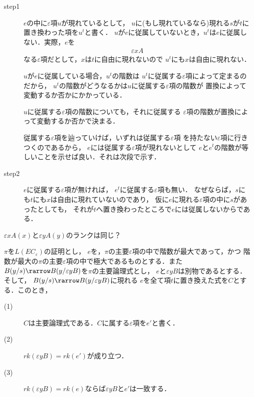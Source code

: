 	\begin{metaprf}\mbox{}
		\begin{description}
			\item[step1]
				$e$の中に$\varepsilon$項$u$が現れているとして，
				$u$に(もし現れているなら)現れる$s$が$t$に置き換わった項を$u^{t}$と書く．
				$u$が$e$に従属していないとき，$u^{t}$は$e$に従属しない．実際，$e$を
				\begin{align}
					\varepsilon x A
				\end{align}
				なる$\varepsilon$項だとして，$x$は$t$に自由に現れないので
				$u^{t}$にも$x$は自由に現れない．
				
				$u$が$e$に従属している場合，$u^{t}$の階数は
				$u^{t}$に従属する$\varepsilon$項によって定まるのだから，
				$u^{t}$の階数がどうなるかは$u$に従属する$\varepsilon$項の階数が
				置換によって変動するか否かにかかっている．
				
				$u$に従属する$\varepsilon$項の階数についても，それに従属する
				$\varepsilon$項の階数が置換によって変動するか否かで決まる．
				
				従属する$\varepsilon$項を辿っていけば，いずれは従属する$\varepsilon$項
				を持たない$\varepsilon$項に行きつくのであるから，
				$e$には従属する$\varepsilon$項が現れないとして
				$e$と$e^{t}$の階数が等しいことを示せば良い．それは次段で示す．
				
			\item[step2]
				$e$に従属する$\varepsilon$項が無ければ，
				$e^{t}$に従属する$\varepsilon$項も無い．
				なぜならば，$s$にも$t$にも$x$は自由に現れていないのであり，
				仮に$e$に現れる$\varepsilon$項の中に$s$があったとしても，
				それが$t$へ置き換わったところで$e$には従属しないからである．
				\QED
		\end{description}
	\end{metaprf}
	
	$\varepsilon x A(x)$と$\varepsilon y A(y)$のランクは同じ？
	
	\begin{screen}
		\begin{metathm}[置換定理]
			$\pi$を$L(EC_{\varepsilon})$の証明とし，
			$e$を，$\pi$の主要$\varepsilon$項の中で階数が最大であって，かつ
			階数が最大の$\pi$の主要$\varepsilon$項の中で極大であるものとする．また
			$B(y/s) \rarrow B(y/\varepsilon y B)$を$\pi$の主要論理式とし，
			$e$と$\varepsilon y B$は別物であるとする．そして，
			$B(y/s) \rarrow B(y/\varepsilon y B)$に現れる
			$e$を全て項$t$に置き換えた式を$C$とする．このとき，
			\begin{description}
				\item[(1)] $C$は主要論理式である．$C$に属する$\varepsilon$項を$e'$と書く．
				\item[(2)] $rk(\varepsilon y B) = rk(e')$が成り立つ．
				\item[(3)] $rk(\varepsilon y B) = rk(e)$ならば$\varepsilon y B$と$e'$は一致する．
			\end{description}
		\end{metathm}
	\end{screen}
	
